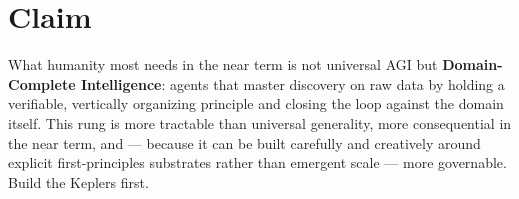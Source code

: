 \section{Claim}
\label{sec:claim}

What humanity most needs in the near term is not universal AGI but \textbf{Domain-Complete Intelligence}: agents that master discovery on raw data by holding a verifiable, vertically organizing principle and closing the loop against the domain itself. This rung is more tractable than universal generality, more consequential in the near term, and --- because it can be built carefully and creatively around explicit first-principles substrates rather than emergent scale --- more governable. Build the Keplers first.
